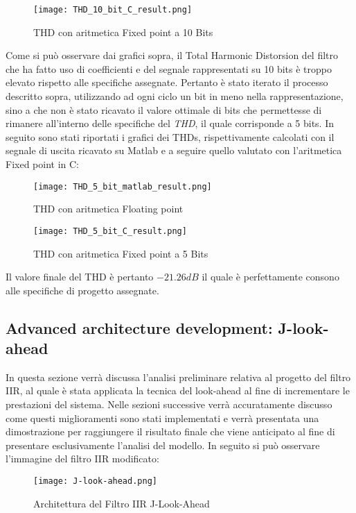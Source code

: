 \begin{figure}[H]
\centering
\texttt{[image: THD\_10\_bit\_C\_result.png]}
\caption{THD con aritmetica Fixed point a 10 Bits}
\label{fig:THD_10_bit_FIX_P}
\end{figure}

Come si può osservare dai grafici sopra, il Total Harmonic Distorsion del filtro che ha fatto uso di coefficienti e del segnale rappresentati su 10 bits è troppo elevato rispetto alle specifiche assegnate. Pertanto è stato iterato il processo descritto sopra, utilizzando ad ogni ciclo un bit in meno nella rappresentazione, sino a che non è stato ricavato il valore ottimale di bits che permettesse di rimanere all'interno delle specifiche del \textit{THD}, il quale corrisponde a 5 bits.
In seguito sono stati riportati i grafici dei THDs, rispettivamente calcolati con il segnale di uscita ricavato su Matlab e a seguire quello valutato con l'aritmetica Fixed point in C:

\begin{figure}[H]
\centering
\texttt{[image: THD\_5\_bit\_matlab\_result.png]}
\caption{THD con aritmetica Floating point}
\label{fig:THD_5_bit_FIX_P}
\end{figure}

\begin{figure}[H]
\centering
\texttt{[image: THD\_5\_bit\_C\_result.png]}
\caption{THD con aritmetica Fixed point a 5 Bits}
\label{fig:THD_5_bit_FIX_P}
\end{figure}

Il valore finale del THD è pertanto $-21.26 dB$ il quale è perfettamente consono alle specifiche di progetto assegnate.

\subsection{Advanced architecture development: J-look-ahead}

In questa sezione verrà discussa l'analisi preliminare relativa al progetto del filtro IIR, al quale è stata applicata la tecnica del look-ahead al fine di incrementare le prestazioni del sistema. Nelle sezioni successive verrà accuratamente discusso come questi miglioramenti sono stati implementati e verrà presentata una dimostrazione per raggiungere il risultato finale che viene anticipato al fine di presentare esclusivamente l'analisi del modello. In seguito si può osservare l'immagine del filtro IIR modificato:

\begin{figure}[H]
\centering
\texttt{[image: J-look-ahead.png]}
\caption{Architettura del Filtro IIR J-Look-Ahead}
\label{fig:IIR_JLA}
\end{figure}

